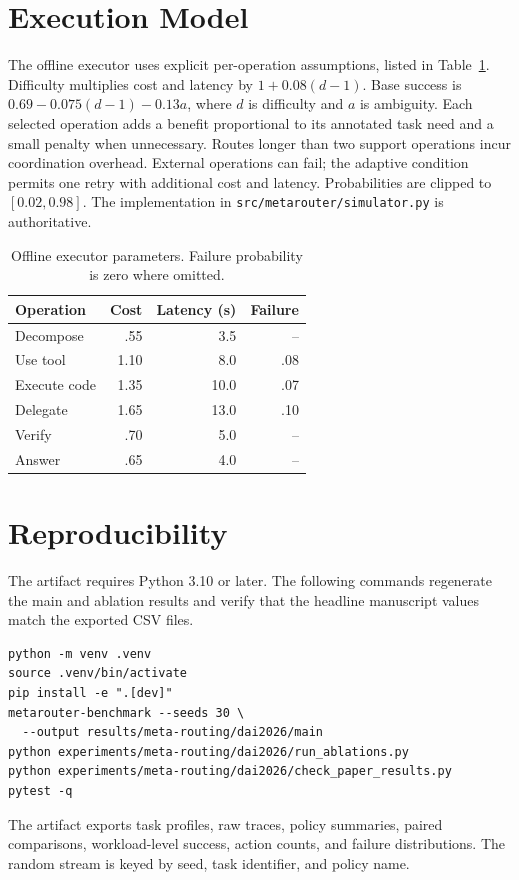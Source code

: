 \documentclass[sigconf]{acmart}
\begin{document}



\appendix

\section{Execution Model}

The offline executor uses explicit per-operation assumptions, listed in Table~\ref{tab:parameters}. Difficulty multiplies cost and latency by $1+0.08(d-1)$. Base success is $0.69-0.075(d-1)-0.13a$, where $d$ is difficulty and $a$ is ambiguity. Each selected operation adds a benefit proportional to its annotated task need and a small penalty when unnecessary. Routes longer than two support operations incur coordination overhead. External operations can fail; the adaptive condition permits one retry with additional cost and latency. Probabilities are clipped to $[0.02,0.98]$. The implementation in \texttt{src/metarouter/simulator.py} is authoritative.

\begin{table}[h]
\caption{Offline executor parameters. Failure probability is zero where omitted.}
\label{tab:parameters}
\small
\begin{tabular}{lrrr}
\toprule
Operation & Cost & Latency (s) & Failure \\
\midrule
Decompose & .55 & 3.5 & -- \\
Use tool & 1.10 & 8.0 & .08 \\
Execute code & 1.35 & 10.0 & .07 \\
Delegate & 1.65 & 13.0 & .10 \\
Verify & .70 & 5.0 & -- \\
Answer & .65 & 4.0 & -- \\
\bottomrule
\end{tabular}
\end{table}

\section{Reproducibility}

The artifact requires Python 3.10 or later. The following commands regenerate the main and ablation results and verify that the headline manuscript values match the exported CSV files.

\begin{verbatim}
python -m venv .venv
source .venv/bin/activate
pip install -e ".[dev]"
metarouter-benchmark --seeds 30 \
  --output results/meta-routing/dai2026/main
python experiments/meta-routing/dai2026/run_ablations.py
python experiments/meta-routing/dai2026/check_paper_results.py
pytest -q
\end{verbatim}

The artifact exports task profiles, raw traces, policy summaries, paired comparisons, workload-level success, action counts, and failure distributions. The random stream is keyed by seed, task identifier, and policy name.
\end{document}
